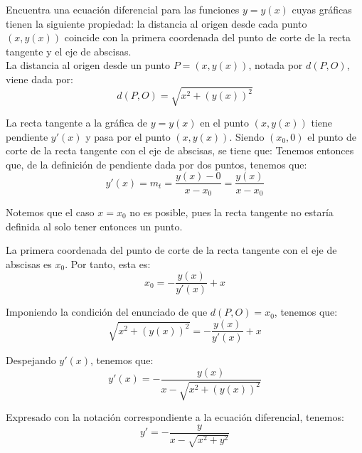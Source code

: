 \documentclass[12pt]{article}
\begin{document}
    \begin{ejercicio}
        Encuentra una ecuación diferencial para las funciones $y=y(x)$ cuyas gráficas tienen la siguiente propiedad:
        la distancia al origen desde cada punto $(x,y(x))$ coincide con la primera coordenada del punto de corte de la recta tangente y el eje de abscisas.\\

        La distancia al origen desde un punto $P=(x,y(x))$, notada por $d(P,O)$, viene dada por:
        \begin{equation*}
            d(P,O) = \sqrt{x^2 + (y(x))^2}
        \end{equation*}

        La recta tangente a la gráfica de $y=y(x)$ en el punto $(x,y(x))$ tiene pendiente $y'(x)$ y pasa por el punto $(x,y(x))$. Siendo $(x_0, 0)$ el punto de corte de la recta tangente con el eje de abscisas, se tiene que:
        Tenemos entonces que, de la definición de pendiente dada por dos puntos, tenemos que:
        \begin{equation*}
            y'(x) = m_t = \dfrac{y(x) - 0}{x - x_0} = \dfrac{y(x)}{x - x_0}
        \end{equation*}

        Notemos que el caso $x=x_0$ no es posible, pues la recta tangente no estaría definida al solo tener entonces un punto.

        La primera coordenada del punto de corte de la recta tangente con el eje de abscisas es $x_0$. Por tanto, esta es:
        \begin{equation*}
            x_0 = -\dfrac{y(x)}{y'(x)} +x
        \end{equation*}

        Imponiendo la condición del enunciado de que $d(P,O) = x_0$, tenemos que:
        \begin{equation*}
            \sqrt{x^2 + (y(x))^2} = -\dfrac{y(x)}{y'(x)} +x
        \end{equation*}

        Despejando $y'(x)$, tenemos que:
        \begin{equation*}
            y'(x) = -\dfrac{y(x)}{x - \sqrt{x^2 + (y(x))^2}}
        \end{equation*}

        Expresado con la notación correspondiente a la ecuación diferencial, tenemos:
        \begin{equation*}
            y' = -\dfrac{y}{x - \sqrt{x^2 + y^2}}
        \end{equation*}
    \end{ejercicio}
\end{document}
